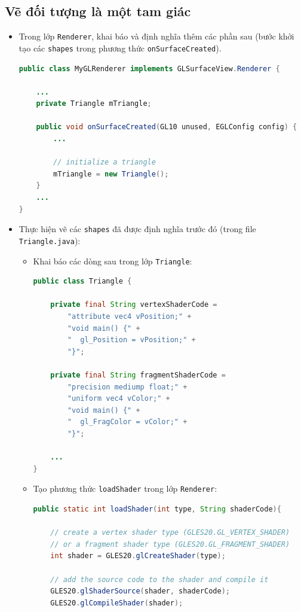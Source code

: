 \documentclass[13pt,a4paper]{extreport}
\begin{document}
\subsection{Vẽ đối tượng là một tam giác}
	\begin{itemize}
		\item Trong lớp \verb|Renderer|, khai báo và định nghĩa thêm các phần sau (bước khởi tạo các \verb|shapes| trong phương thức \verb|onSurfaceCreated|).
			\begin{lstlisting}[language=Java]
public class MyGLRenderer implements GLSurfaceView.Renderer {

    ...
    private Triangle mTriangle;

    public void onSurfaceCreated(GL10 unused, EGLConfig config) {
        ...

        // initialize a triangle
        mTriangle = new Triangle();        
    }
    ...
}
			\end{lstlisting}
		
		\item Thực hiện vẽ các \verb|shapes| đã được định nghĩa trước đó (trong file \verb|Triangle.java|):%
			\begin{itemize}
				\item Khai báo các dòng sau trong lớp \verb|Triangle|:
					\begin{lstlisting}[language=Java]
public class Triangle {

    private final String vertexShaderCode =
        "attribute vec4 vPosition;" +
        "void main() {" +
        "  gl_Position = vPosition;" +
        "}";

    private final String fragmentShaderCode =
        "precision mediump float;" +
        "uniform vec4 vColor;" +
        "void main() {" +
        "  gl_FragColor = vColor;" +
        "}";

    ...
}						
					\end{lstlisting}
				
				\item Tạo phương thức \verb|loadShader| trong lớp \verb|Renderer|:
					\begin{lstlisting}[language=Java]
public static int loadShader(int type, String shaderCode){

    // create a vertex shader type (GLES20.GL_VERTEX_SHADER)
    // or a fragment shader type (GLES20.GL_FRAGMENT_SHADER)
    int shader = GLES20.glCreateShader(type);

    // add the source code to the shader and compile it
    GLES20.glShaderSource(shader, shaderCode);
    GLES20.glCompileShader(shader);


\end{lstlisting}
\end{itemize}
\end{itemize}
\end{document}
